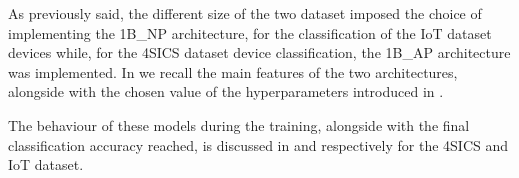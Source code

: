 As previously said, the different size of the two dataset imposed the choice of implementing the 1B\_NP architecture, for the classification of the IoT dataset devices while, for the 4SICS dataset device classification, the 1B\_AP architecture was implemented. 
In  we recall the main features of the two architectures, alongside with the chosen value of the hyperparameters introduced in .

The behaviour of these models during the training, alongside with the final classification accuracy reached, is discussed in  and  respectively for the 4SICS and IoT dataset.





